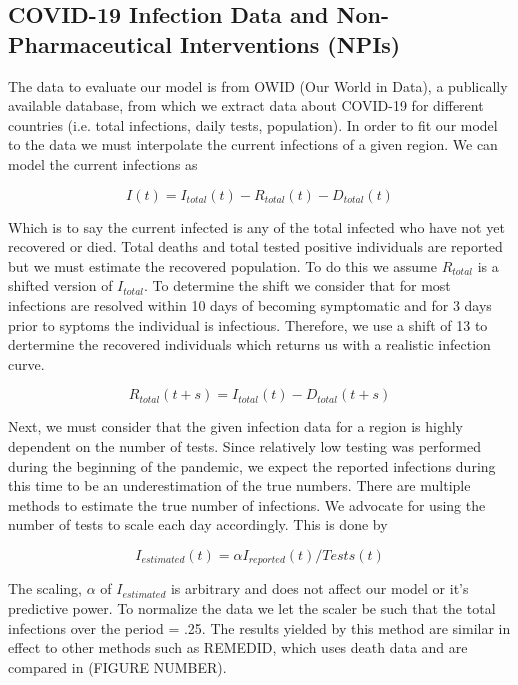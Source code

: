 \documentclass[letterpaper, 10 pt, conference]{ieeeconf}  %
\begin{document}
\subsection{COVID-19 Infection Data and Non-Pharmaceutical Interventions (NPIs)}

The data to evaluate our model is from OWID (Our World in Data), a publically available database, from which we extract data about COVID-19 for different countries (i.e. total infections, daily tests, population). In order to fit our model to the data we must interpolate the current infections of a given region. We can model the current infections as

\begin{equation*}
I(t) = I_{total}(t) - R_{total}(t) - D_{total}(t)
\end{equation*}

Which is to say the current infected is any of the total infected who have not yet recovered or died. Total deaths and total tested positive individuals are reported but we must estimate the recovered population. To do this we assume $R_{total}$ is a shifted version of $I_{total}$. To determine the shift we consider that for most infections are resolved within 10 days of becoming symptomatic and for 3 days prior to syptoms the individual is infectious. Therefore, we use a shift of 13 to dertermine the recovered individuals which returns us with a realistic infection curve.

\begin{equation*}
R_{total}(t + s) = I_{total}(t) - D_{total}(t+s)
\end{equation*}

Next, we must consider that the given infection data for a region is highly dependent on the number of tests. Since relatively low testing was performed during the beginning of the pandemic, we expect the reported infections during this time to be an underestimation of the true numbers. There are multiple methods to estimate the true number of infections. We advocate for using the number of tests to scale each day accordingly. This is done by 

\begin{equation*}
I_{estimated}(t) = \alpha I_{reported}(t) / Tests(t)
\end{equation*}

The scaling, $\alpha$ of $I_{estimated}$ is arbitrary and does not affect our model or it's predictive power. To normalize the data we let the scaler be such that the total infections over the period = .25. The results yielded by this method are similar in effect to other methods such as REMEDID, which uses death data and are compared in (FIGURE NUMBER).
\end{document}
